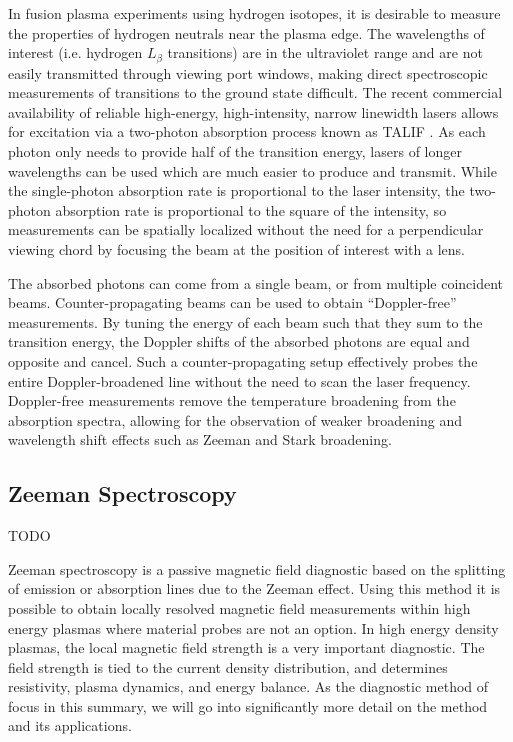 \documentclass{jpp}
\begin{document}
In fusion plasma experiments using hydrogen isotopes, it is desirable to measure the properties of hydrogen neutrals near the plasma edge. The wavelengths of interest (i.e. hydrogen $L_\beta$ transitions) are in the ultraviolet range and are not easily transmitted through viewing port windows, making direct spectroscopic measurements of transitions to the ground state difficult. The recent commercial availability of reliable high-energy, high-intensity, narrow linewidth lasers allows for excitation via a two-photon absorption process known as TALIF \citep{MageeRM2012Atpa}. As each photon only needs to provide half of the transition energy, lasers of longer wavelengths can be used which are much easier to produce and transmit. While the single-photon absorption rate is proportional to the laser intensity, the two-photon absorption rate is proportional to the square of the intensity, so measurements can be spatially localized without the need for a perpendicular viewing chord by focusing the beam at the position of interest with a lens.

The absorbed photons can come from a single beam, or from multiple coincident beams. Counter-propagating beams can be used to obtain ``Doppler-free'' measurements. By tuning the energy of each beam such that they sum to the transition energy, the Doppler shifts of the absorbed photons are equal and opposite and cancel. Such a counter-propagating setup effectively probes the entire Doppler-broadened line without the need to scan the laser frequency. Doppler-free measurements remove the temperature broadening from the absorption spectra, allowing for the observation of weaker broadening and wavelength shift effects such as Zeeman and Stark broadening.

\subsection{Zeeman Spectroscopy}

{\Large TODO \par}

Zeeman spectroscopy is a passive magnetic field diagnostic based on the splitting of emission or absorption lines due to the Zeeman effect. Using this method it is possible to obtain locally resolved magnetic field measurements within high energy plasmas where material probes are not an option. In high energy density plasmas, the local magnetic field strength is a very important diagnostic. The field strength is tied to the current density distribution, and determines resistivity, plasma dynamics, and energy balance. As the diagnostic method of focus in this summary, we will go into significantly more detail on the method and its applications.
\end{document}
